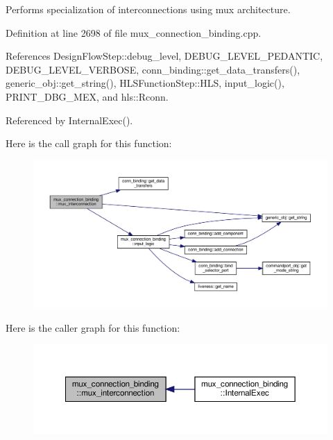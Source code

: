 Performs specialization of interconnections using mux architecture. 



Definition at line 2698 of file mux\+\_\+connection\+\_\+binding.\+cpp.



References Design\+Flow\+Step\+::debug\+\_\+level, D\+E\+B\+U\+G\+\_\+\+L\+E\+V\+E\+L\+\_\+\+P\+E\+D\+A\+N\+T\+IC, D\+E\+B\+U\+G\+\_\+\+L\+E\+V\+E\+L\+\_\+\+V\+E\+R\+B\+O\+SE, conn\+\_\+binding\+::get\+\_\+data\+\_\+transfers(), generic\+\_\+obj\+::get\+\_\+string(), H\+L\+S\+Function\+Step\+::\+H\+LS, input\+\_\+logic(), P\+R\+I\+N\+T\+\_\+\+D\+B\+G\+\_\+\+M\+EX, and hls\+::\+Rconn.



Referenced by Internal\+Exec().

Here is the call graph for this function\+:
\nopagebreak
\begin{figure}[H]
\begin{center}
\leavevmode
\includegraphics[width=350pt]{d7/d1e/classmux__connection__binding_adfcb7df795ba15e433753c6682e44daa_cgraph}
\end{center}
\end{figure}
Here is the caller graph for this function\+:
\nopagebreak
\begin{figure}[H]
\begin{center}
\leavevmode
\includegraphics[width=350pt]{d7/d1e/classmux__connection__binding_adfcb7df795ba15e433753c6682e44daa_icgraph}
\end{center}
\end{figure}
\mbox{\label{classmux__connection__binding_a5a1ab44883c4e500c1a23724fbff9364}} 
